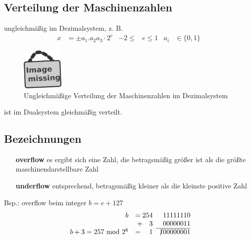 \documentclass[ngerman,fontsize=11pt, paper=a4, parskip=half, titlepage=true, toc=bib]{scrbook}
\theoremstyle{definition}
\theoremstyle{plain}
\begin{document}
  \subsection{Verteilung der Maschinenzahlen} \label{3.1.4}
  ungleichmäßig im Dezimalsystem, z. B.
  \begin{align*}
    x &= \pm a_1 . a_2 a_3 \cdot 2^e  & -2\leq & e\leq 1 & a_i & \in \{0,1\} 
  \end{align*}
  \begin{figure}
    \parbox{\linewidth}{
      \centering
      \includegraphics[width=2cm]{images/image_missing.jpg}
    }
    \caption{Ungleichmäßige Verteilung der Maschinenzahlen im Dezimalsystem}
  \end{figure}
  ist im Dualsystem gleichmäßig verteilt.

  \subsection{Bezeichnungen}\label{3.1.5}
  \begin{itemize}
  \item[\textbf{overflow}] es ergibt sich eine Zahl, die betragsmäßig größer ist als die größte maschinendarstellbare Zahl
  \item[\textbf{underflow}] entsprechend, betragsmäßig kleiner als die kleinste positive Zahl
  \end{itemize}
  Bsp.: overflow beim integer $b=e+127$
  \begin{align*}
    \begin{array}{rrr@{}}
      b &= 254                                &11111110 \\
        &+  \phantom{24}3 &00000011 \\
      \cline{3-3} %
      b+3 = 257 \text{ mod } 2^8  &=\phantom{24}1& \xout{1}00000001 
    \end{array}	  
  \end{align*}
\end{document}
